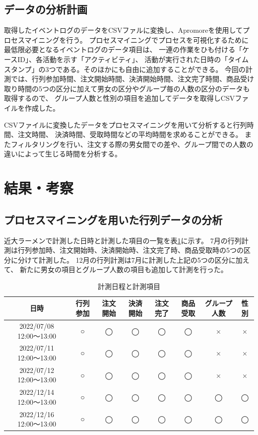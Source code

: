 \documentclass{jsarticle}
\begin{document}
\subsection{データの分析計画}
取得したイベントログのデータをCSVファルに変換し、Apromoreを使用してプロセスマイニングを行う。
プロセスマイニングでプロセスを可視化するために最低限必要となるイベントログのデータ項目は、
一連の作業をひも付ける「ケースID」、各活動を示す「アクティビティ」、
活動が実行された日時の「タイムスタンプ」の3つである。そのほかにも自由に追加することができる。
今回の計測では、行列参加時間、注文開始時間、決済開始時間、注文完了時間、商品受け取り時間の5つの区分に加えて男女の区分やグループ毎の人数の区分のデータも取得するので、
グループ人数と性別の項目を追加してデータを取得しCSVファイルを作成した。

CSVファイルに変換したデータをプロセスマイニングを用いて分析すると行列時間、注文時間、
決済時間、受取時間などの平均時間を求めることができる。
またフィルタリングを行い、注文する際の男女間での差や、グループ間での人数の違いによって生じる時間を分析する。




\newpage

\section{結果・考察}

\subsection{プロセスマイニングを用いた行列データの分析}
近大ラーメンで計測した日時と計測した項目の一覧を表\ref{table5}に示す。
7月の行列計測は行列参加時、注文開始時、決済開始時、注文完了時、商品受取時の5つの区分に分けて計測した。
12月の行列計測は7月に計測した上記の5つの区分に加えて、
新たに男女の項目とグループ人数の項目も追加して計測を行った。

\begin{table}[H]
 \begin{center}
   \caption{計測日程と計測項目}
   \begin{tabular}{|c|c|c|c|c|c|c|c|} \hline
日時 & 行列参加 & 注文開始 & 決済開始 & 注文完了 & 商品受取 & グループ人数 & 性別 \\ \hline \hline
2022/07/08 12:00〜13:00 & ○ & ◯ & ◯ & ◯ & ◯ & × & × \\ \hline
2022/07/11 12:00〜13:00 & ○ & ◯ & ◯ & ◯ & ◯ & × & × \\ \hline
2022/07/12 12:00〜13:00 & ○ & ◯ & ◯ & ◯ & ◯ & × & × \\ \hline
2022/12/14 12:00〜13:00 & ○ & ◯ & ◯ & ◯ & ◯ & ◯ & ◯ \\ \hline
2022/12/16 12:00〜13:00 & ○ & ◯ & ◯ & ◯ & ◯ & ◯ & ◯ \\ \hline
  \end{tabular}
 \label{table5}
 \end{center}
\end{table}
\end{document}
